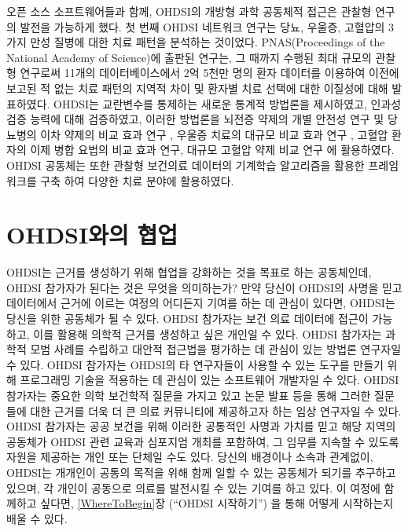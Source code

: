 \documentclass[11pt]{book}
\theoremstyle{definition}
\theoremstyle{definition}
\theoremstyle{definition}
\theoremstyle{remark}
\begin{document}
오픈 소스 소프트웨어들과 함께, OHDSI의 개방형 과학 공동체적 접근은
관찰형 연구의 발전을 가능하게 했다. 첫 번째 OHDSI 네트워크 연구는 당뇨,
우울증, 고혈압의 3가지 만성 질병에 대한 치료 패턴을 분석하는 것이었다.
PNAS(Proceedings of the National Academy of Science)에 출판된 연구는, 그
때까지 수행된 최대 규모의 관찰형 연구로써 11개의 데이터베이스에서 2억
5천만 명의 환자 데이터를 이용하여 이전에 보고된 적 없는 치료 패턴의
지역적 차이 및 환자별 치료 선택에 대한 이질성에 대해 발표하였다.
\citep{Hripcsak7329} OHDSI는 교란변수를 통제하는 새로운 통계적 방법론을
제시하였고, \citep{tian_2018} 인과성 검증 능력에 대해 검증하였고,
\citep{schuemie_2018} 이러한 방법론을 뇌전증 약제의 개별 안전성 연구
\citep{duke_2017} 및 당뇨병의 이차 약제의 비교 효과 연구
\citep{vashisht_2018}, 우울증 치료의 대규모 비교 효과 연구
\citep{schuemie_2018b}, 고혈압 환자의 이제 병합 요법의 비교 효과
연구\citep{you_olmesartan_2019}, 대규모 고혈압 약제 비교
연구\citep{suchard_comprehensive_2019} 에 활용하였다. OHDSI 공동체는
또한 관찰형 보건의료 데이터의 기계학습 알고리즘을 활용한 프레임 워크를
구축 \citep{reps2018} 하여 다양한 치료 분야에 활용하였다.
\citep{johnston_2019, cepeda_2018, reps_2019}

\hypertarget{ohdsi-}{\section{OHDSI와의 협업}\label{ohdsi-}}

OHDSI는 근거를 생성하기 위해 협업을 강화하는 것을 목표로 하는
공동체인데, OHDSI 참가자가 된다는 것은 무엇을 의미하는가? 만약 당신이
OHDSI의 사명을 믿고 데이터에서 근거에 이르는 여정의 어디든지 기여를 하는
데 관심이 있다면, OHDSI는 당신을 위한 공동체가 될 수 있다. OHDSI
참가자는 보건 의료 데이터에 접근이 가능하고, 이를 활용해 의학적 근거를
생성하고 싶은 개인일 수 있다. OHDSI 참가자는 과학적 모범 사례를 수립하고
대안적 접근법을 평가하는 데 관심이 있는 방법론 연구자일 수 있다. OHDSI
참가자는 OHDSI의 타 연구자들이 사용할 수 있는 도구를 만들기 위해
프로그래밍 기술을 적용하는 데 관심이 있는 소프트웨어 개발자일 수 있다.
OHDSI 참가자는 중요한 의학 보건학적 질문을 가지고 있고 논문 발표 등을
통해 그러한 질문들에 대한 근거를 더욱 더 큰 의료 커뮤니티에 제공하고자
하는 임상 연구자일 수 있다. OHDSI 참가자는 공공 보건을 위해 이러한
공통적인 사명과 가치를 믿고 해당 지역의 공동체가 OHDSI 관련 교육과
심포지엄 개최를 포함하여, 그 임무를 지속할 수 있도록 자원을 제공하는
개인 또는 단체일 수도 있다. 당신의 배경이나 소속과 관계없이, OHDSI는
개개인이 공통의 목적을 위해 함께 일할 수 있는 공동체가 되기를 추구하고
있으며, 각 개인이 공동으로 의료를 발전시킬 수 있는 기여를 하고 있다. 이
여정에 함께하고 싶다면, \ref{WhereToBegin}장 (``OHDSI 시작하기'') 을
통해 어떻게 시작하는지 배울 수 있다.
\end{document}
